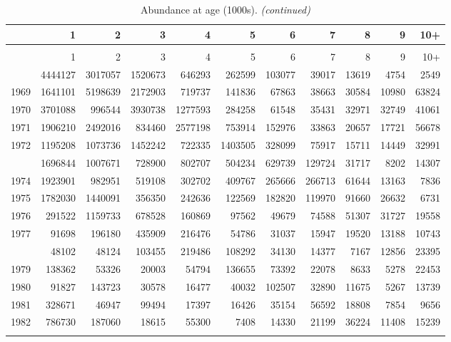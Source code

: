 \documentclass[
]{article}
\begin{document}
\begin{longtable}[t]{lrrrrrrrrrr}
\caption{\label{tab:NAA-table}Abundance at age (1000s).}\\
\toprule
  & 1 & 2 & 3 & 4 & 5 & 6 & 7 & 8 & 9 & 10+\\
\midrule
\endfirsthead
\caption[]{Abundance at age (1000s). \textit{(continued)}}\\
\toprule
  & 1 & 2 & 3 & 4 & 5 & 6 & 7 & 8 & 9 & 10+\\
\midrule
\endhead

\endfoot
\bottomrule
\endlastfoot
1968 & 4444127 & 3017057 & 1520673 & 646293 & 262599 & 103077 & 39017 & 13619 & 4754 & 2549\\
1969 & 1641101 & 5198639 & 2172903 & 719737 & 141836 & 67863 & 38663 & 30584 & 10980 & 63824\\
1970 & 3701088 & 996544 & 3930738 & 1277593 & 284258 & 61548 & 35431 & 32971 & 32749 & 41061\\
1971 & 1906210 & 2492016 & 834460 & 2577198 & 753914 & 152976 & 33863 & 20657 & 17721 & 56678\\
1972 & 1195208 & 1073736 & 1452242 & 722335 & 1403505 & 328099 & 75917 & 15711 & 14449 & 32991\\
\addlinespace
1973 & 1696844 & 1007671 & 728900 & 802707 & 504234 & 629739 & 129724 & 31717 & 8202 & 14307\\
1974 & 1923901 & 982951 & 519108 & 302702 & 409767 & 265666 & 266713 & 61644 & 13163 & 7836\\
1975 & 1782030 & 1440091 & 356350 & 242636 & 122569 & 182820 & 119970 & 91660 & 26632 & 6731\\
1976 & 291522 & 1159733 & 678528 & 160869 & 97562 & 49679 & 74588 & 51307 & 31727 & 19558\\
1977 & 91698 & 196180 & 435909 & 216476 & 54786 & 31037 & 15947 & 19520 & 13188 & 10743\\
\addlinespace
1978 & 48102 & 48124 & 103455 & 219486 & 108292 & 34130 & 14377 & 7167 & 12856 & 23395\\
1979 & 138362 & 53326 & 20003 & 54794 & 136655 & 73392 & 22078 & 8633 & 5278 & 22453\\
1980 & 91827 & 143723 & 30578 & 16477 & 40032 & 102507 & 32890 & 11675 & 5267 & 13739\\
1981 & 328671 & 46947 & 99494 & 17397 & 16426 & 35154 & 56592 & 18808 & 7854 & 9656\\
1982 & 786730 & 187060 & 18615 & 55300 & 7408 & 14330 & 21199 & 36224 & 11408 & 15239\\
\addlinespace

\end{longtable}
\end{document}
